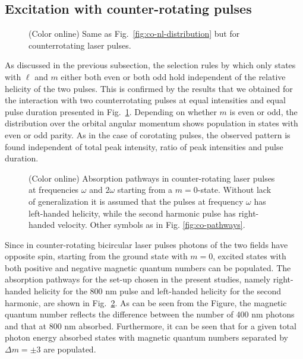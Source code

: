 \subsection{Excitation with counter-rotating pulses}

\begin{figure}[h!]
\caption{\label{fig:counter-nl-distribution}
(Color online) Same as Fig.\ \ref{fig:co-nl-distribution} but for counterrotating laser pulses.
}
\end{figure}

As discussed in the previous subsection, the selection rules by which only states with $\ell$ and $m$ either both even or both odd hold independent of the relative helicity of the two pulses. This is confirmed by the results that we obtained for the interaction with two counterrotating pulses at equal intensities and equal pulse duration presented in Fig.\ \ref{fig:counter-nl-distribution}. Depending on whether $m$ is even or odd, the distribution over the orbital angular momentum shows population in states with even or odd parity. As in the case of corotating pulses, the observed pattern is found independent of total peak intensity, ratio of peak intensities and pulse duration.


\begin{figure}[h!]
 \centering
 \caption{\label{fig:counter-pathways}
 (Color online) Absorption pathways in counter-rotating laser pulses at frequencies $\omega$ and $2 \omega$ starting from a $m=0$-state. Without lack of generalization it is assumed that the pulses at frequency $\omega$ has left-handed helicity, while the second harmonic pulse has right-handed velocity. Other symbols as in Fig. \ref{fig:co-pathways}.
 }
 \end{figure}

Since in counter-rotating bicircular laser pulses photons of the two fields have opposite spin, starting from the ground state with $m=0$, excited states with both positive and negative magnetic quantum numbers can be populated. The absorption pathways for the set-up chosen in the present studies, namely right-handed helicity for the 800 nm pulse and left-handed helicity for the second harmonic, are shown in Fig.\ \ref{fig:counter-pathways}. As can be seen from the Figure, the magnetic quantum number reflects the difference between the number of 400 nm photons and that at 800 nm absorbed. Furthermore, it can be seen that for a given total photon energy absorbed states with magnetic quantum numbers separated by $\Delta m = \pm 3$ are populated. 

